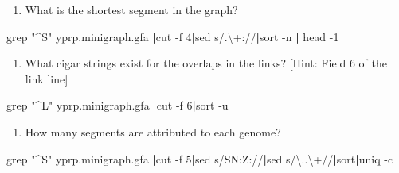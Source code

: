 \documentclass[
]{book}
\newenvironment{Shaded}{\begin{snugshade}}{\end{snugshade}}
\newcommand{\AttributeTok}[1]{\textcolor[rgb]{0.77,0.63,0.00}{#1}}
\newcommand{\FunctionTok}[1]{\textcolor[rgb]{0.00,0.00,0.00}{#1}}
\newcommand{\KeywordTok}[1]{\textcolor[rgb]{0.13,0.29,0.53}{\textbf{#1}}}
\newcommand{\NormalTok}[1]{#1}
\newcommand{\StringTok}[1]{\textcolor[rgb]{0.31,0.60,0.02}{#1}}
\providecommand{\tightlist}{%
  \setlength{\itemsep}{0pt}\setlength{\parskip}{0pt}}
\begin{document}
\begin{enumerate}
\def\labelenumi{\arabic{enumi}.}
\setcounter{enumi}{1}
\tightlist
\item
  What is the shortest segment in the graph?
\end{enumerate}

\begin{Shaded}
\begin{Highlighting}[]
\FunctionTok{grep} \StringTok{"\^{}S"}\NormalTok{ yprp.minigraph.gfa }\KeywordTok{|}\FunctionTok{cut} \AttributeTok{{-}f}\NormalTok{ 4}\KeywordTok{|}\FunctionTok{sed} \StringTok{\textquotesingle{}s/.\textbackslash{}+://\textquotesingle{}}\KeywordTok{|}\FunctionTok{sort} \AttributeTok{{-}n} \KeywordTok{|} \FunctionTok{head} \AttributeTok{{-}1}
\end{Highlighting}
\end{Shaded}

\begin{enumerate}
\def\labelenumi{\arabic{enumi}.}
\setcounter{enumi}{2}
\tightlist
\item
  What cigar strings exist for the overlaps in the links? {[}Hint: Field 6 of the link line{]}
\end{enumerate}

\begin{Shaded}
\begin{Highlighting}[]
\FunctionTok{grep} \StringTok{"\^{}L"}\NormalTok{ yprp.minigraph.gfa }\KeywordTok{|}\FunctionTok{cut} \AttributeTok{{-}f}\NormalTok{ 6}\KeywordTok{|}\FunctionTok{sort} \AttributeTok{{-}u}
\end{Highlighting}
\end{Shaded}

\begin{enumerate}
\def\labelenumi{\arabic{enumi}.}
\setcounter{enumi}{3}
\tightlist
\item
  How many segments are attributed to each genome?
\end{enumerate}

\begin{Shaded}
\begin{Highlighting}[]
\FunctionTok{grep} \StringTok{"\^{}S"}\NormalTok{ yprp.minigraph.gfa }\KeywordTok{|}\FunctionTok{cut} \AttributeTok{{-}f}\NormalTok{ 5}\KeywordTok{|}\FunctionTok{sed} \StringTok{\textquotesingle{}s/SN:Z://\textquotesingle{}}\KeywordTok{|}\FunctionTok{sed} \StringTok{\textquotesingle{}s/\textbackslash{}..\textbackslash{}+//\textquotesingle{}}\KeywordTok{|}\FunctionTok{sort}\KeywordTok{|}\FunctionTok{uniq} \AttributeTok{{-}c}
\end{Highlighting}
\end{Shaded}
\end{document}
